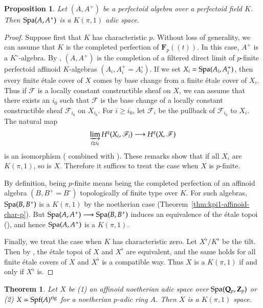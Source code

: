 \documentclass[twoside]{amsart}
\newcommand{\FF}{\mathbf{F}}
\newcommand{\QQ}{\mathbf{Q}}
\newcommand{\ZZ}{\mathbf{Z}}
\newcommand{\Ff}{\mathscr{F}}
\newcommand{\rig}{{\rm rig}}
\DeclareMathOperator{\Spf}{Spf}
\renewcommand{\to}{\longrightarrow}
\theoremstyle{plain}
\newtheorem{proposition}[subsubsection]{Proposition}
\newtheorem{theorem}[subsubsection]{Theorem}
\theoremstyle{definition}
\theoremstyle{remark}
\numberwithin{equation}{subsection}
\begin{document}
\begin{proposition} \label{prop:kpi1-perfectoid}
	Let $(A, A^+)$ be a perfectoid algebra over a perfectoid field $K$. Then ${\rm Spa}(A, A^+)$ is a $K(\pi, 1)$ adic space.
\end{proposition}

\begin{proof}
	Suppose first that $K$ has characteristic $p$. Without loss of generality, we can assume that $K$ is the completed perfection of $\FF_p((t))$. In this case, $A^+$ is a $K^\circ$-algebra. By \cite[Lemma 6.13 (i)]{Scholze}, $(A, A^+)$ is the completion of a filtered direct limit of $p$-finite perfectoid affinoid $K$-algebras $(A_i, A^+_i=A^\circ_i)$. If we set $X_i ={\rm Spa}(A_i, A^+_i)$, then every finite \'etale cover of $X$ comes by base change from a finite \'etale cover of $X_i$. Thus if $\Ff$ is a locally constant constructible sheaf on $X$, we can assume that there exists an $i_0$ such that $\Ff$ is the base change of a locally constant constructible sheaf $\Ff_{i_0}$ on $X_{i_0}$. For $i\geq i_0$, let $\Ff_i$ be the pullback of $\Ff_{i_0}$ to $X_i$. The natural map
	\[ 
		\varinjlim_{i\geq i_0} H^q(X_i, \Ff_i) \to H^q(X, \Ff)
	\] 
	is an isomorphism (\cite[Corollary~7.18]{Scholze} combined with \cite[Corollary~7.19]{Scholze}). These remarks show that if all $X_i$ are $K(\pi, 1)$, so is $X$. Therefore it suffices to treat the case when $X$ is $p$-finite.

	By definition, being $p$-finite means being the completed perfection of an affinoid algebra $(B, B^+=B^\circ)$ topologically of finite type over $K$. For such algebras, ${\rm Spa}(B, B^+)$ is a $K(\pi, 1)$ by the noetherian case (Theorem~\ref{thm:kpi1-affinoid-char-p}). But ${\rm Spa}(A, A^+)\to {\rm Spa}(B, B^+)$ induces an equivalence of the \'etale topoi (\cite[Corollary~7.19]{Scholze}), and hence ${\rm Spa}(A, A^+)$ is a $K(\pi, 1)$.

	Finally, we treat the case when $K$ has characteristic zero. Let $X^\flat / K^\flat$ be the tilt. Then by \cite[Theorem~7.12]{Scholze}, the \'etale topoi of $X$ and $X^\flat$ are equivalent, and the same holds for all finite \'etale covers of $X$ and $X^\flat$ is a compatible way. Thus $X$ is a $K(\pi, 1)$ if and only if $X^\flat$ is. 
\end{proof}

\begin{theorem} \label{thm:kpi1affinoid-mixed}
	Let $X$ be (1) an affinoid noetherian adic space over ${\rm Spa}(\QQ_p, \ZZ_p)$ or (2) $X=\Spf(A)^\rig$ for a noetherian $p$-adic ring $A$. Then $X$ is a $K(\pi, 1)$ space.
\end{theorem}
\end{document}
